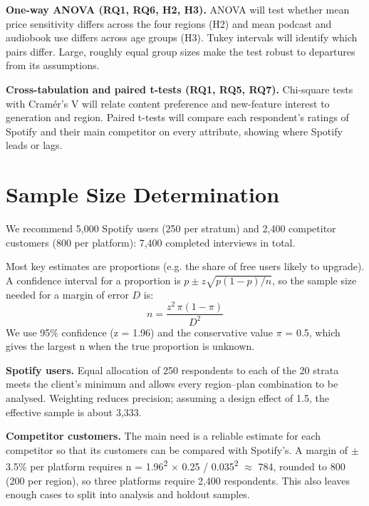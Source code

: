 \documentclass[11pt,a4paper]{article}
\begin{document}
\textbf{One-way ANOVA (RQ1, RQ6, H2, H3).} ANOVA will test whether mean price sensitivity differs across the four regions (H2) and mean podcast and audiobook use differs across age groups (H3). Tukey intervals will identify which pairs differ. Large, roughly equal group sizes make the test robust to departures from its assumptions.

\textbf{Cross-tabulation and paired t-tests (RQ1, RQ5, RQ7).} Chi-square tests with Cramér's V will relate content preference and new-feature interest to generation and region. Paired t-tests will compare each respondent's ratings of Spotify and their main competitor on every attribute, showing where Spotify leads or lags.

\section{Sample Size Determination}
\label{sec:sample-size}
We recommend 5,000 Spotify users (250 per stratum) and 2,400 competitor customers (800 per platform): 7,400 completed interviews in total.

Most key estimates are proportions (e.g. the share of free users likely to upgrade). A confidence interval for a proportion is \(p \pm z\sqrt{p(1-p)/n}\), so the sample size needed for a margin of error \(D\) is:
\[
n = \frac{z^2 \, \pi (1 - \pi)}{D^2}
\]
We use 95\% confidence (z = 1.96) and the conservative value \(\pi\) = 0.5, which gives the largest n when the true proportion is unknown.

\textbf{Spotify users.} Equal allocation of 250 respondents to each of the 20 strata meets the client's minimum and allows every region–plan combination to be analysed. Weighting reduces precision; assuming a design effect of 1.5, the effective sample is about 3,333.

\textbf{Competitor customers.} The main need is a reliable estimate for each competitor so that its customers can be compared with Spotify's. A margin of \(\pm\)3.5\% per platform requires n = 1.96\textsuperscript{2} \(\times\) 0.25 / 0.035\textsuperscript{2} \(\approx\) 784, rounded to 800 (200 per region), so three platforms require 2,400 respondents. This also leaves enough cases to split into analysis and holdout samples.
\end{document}
